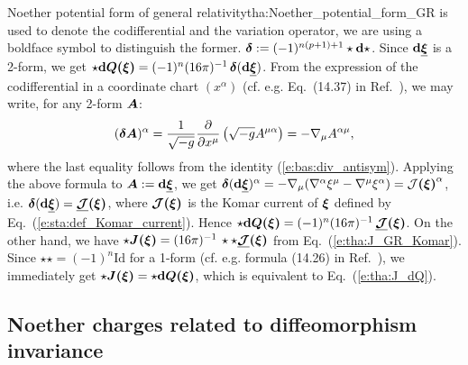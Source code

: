 \begin{texample}{Noether potential form of general relativity}{tha:Noether_potential_form_GR}
{is used to denote the codifferential and the variation operator,
we are using a boldface symbol to distinguish the former.}
$\bm{\delta} := (-1)^{n(p+1)+1} \star\mathbf{d}\star$. Since $\mathbf{d} \underline{\bm{\xi}}$ is a 2-form, we get
$\star\mathbf{d}\bm{Q}\textbf{(}\bm{\xi}\textbf{)} = (-1)^n (16\pi)^{-1}\, \bm{\delta}(\mathbf{d} \underline{\bm{\xi}})$. From the expression of the
codifferential in a coordinate chart $(x^\alpha)$ (cf. e.g. Eq.~(14.37) in Ref.~\cite{Strau13}), we may
write, for any 2-form $\bm{A}$:
\[
        (\bm{\delta}\bm{A})^\alpha = \frac{1}{\sqrt{-g}} \frac{\partial }{\partial x^\mu} \left(\sqrt{-g} A^{\mu\alpha} \right)
            = - \nabla_\mu A^{\alpha\mu} ,
\]
where the last equality follows from the identity (\ref{e:bas:div_antisym}).
Applying the above formula to $\bm{A} := \mathbf{d}\underline{\bm{\xi}}$,  we get
$\bm{\delta}(\mathbf{d}\underline{\bm{\xi}})^\alpha = - \nabla_\mu (\nabla^\alpha \xi^\mu - \nabla^\mu \xi^\alpha) = \mathcal{J}\textbf{(}\bm{\xi}\textbf{)}^\alpha$, i.e. $\bm{\delta}(\mathbf{d}\underline{\bm{\xi}}) = \underline{\bm{\mathcal{J}}}\textbf{(}\bm{\xi}\textbf{)}$,
where $\bm{\mathcal{J}}\textbf{(}\bm{\xi}\textbf{)}$ is the Komar current of $\bm{\xi}$
defined by Eq.~(\ref{e:sta:def_Komar_current}).
Hence $\star\mathbf{d}\bm{Q}\textbf{(}\bm{\xi}\textbf{)} = (-1)^n (16\pi)^{-1}\, \underline{\bm{\mathcal{J}}}\textbf{(}\bm{\xi}\textbf{)}$. On the other hand, we have
$\star \bm{J}\textbf{(}\bm{\xi}\textbf{)} =(16\pi)^{-1}\, \star \star\underline{\bm{\mathcal{J}}}\textbf{(}\bm{\xi}\textbf{)}$ from
Eq.~(\ref{e:tha:J_GR_Komar}). Since $\star\star = (-1)^n \mathrm{Id}$ for a 1-form
(cf. e.g. formula (14.26) in Ref.~\cite{Strau13}), we immediately get
$\star \bm{J}\textbf{(}\bm{\xi}\textbf{)}  = \star\mathbf{d}\bm{Q}\textbf{(}\bm{\xi}\textbf{)}$, which is equivalent to
Eq.~(\ref{e:tha:J_dQ}).
\end{texample}

\subsection{Noether charges related to diffeomorphism invariance}

